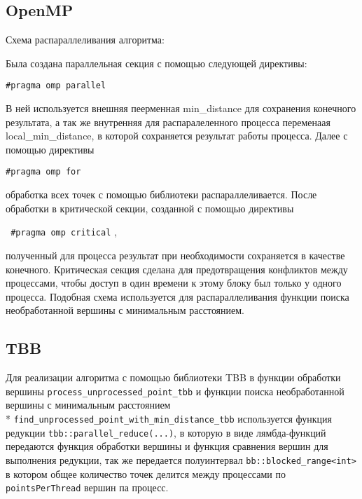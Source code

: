 \documentclass{report}
\begin{document}
\subsection*{OpenMP}
Схема распараллеливания алгоритма:
\par Была создана параллельная секция с помощью следующей директивы:
\par \verb|#pragma omp parallel| 
\par В ней используется внешняя пеерменная min\_distance для сохранения конечного результата, а так же внутренняя для распаралеленного процесса переменаая local\_min\_distance, в которой сохраняется результат работы процесса. Далее с помощью директивы
\par \verb|#pragma omp for |
\par обработка всех точек с помощью библиотеки распараллеливается. После обработки в критической секции, созданной с помощью директивы \par \verb| #pragma omp critical| , \par полученный для процесса результат при необходимости сохраняется в качестве конечного. Критическая секция сделана для предотвращения конфликтов между процессами, чтобы доступ в один времени к этому блоку был только у одного процесса. Подобная схема используется для распараллеливания функции поиска необработанной вершины с минимальным расстоянием.


\subsection*{TBB}
\begin{sloppypar}
Для реализации алгоритма с помощью библиотеки TBB в функции обработки вершины \verb|process_unprocessed_point_tbb| и функции поиска необработанной вершины с минимальным расстоянием \\* \verb|find_unprocessed_point_with_min_distance_tbb| используется функция редукции \verb|tbb::parallel_reduce(...)|, в которую в виде лямбда-функций передаются функция обработки вершины и функция сравнения вершин для выполнения редукции, так же передается полуинтервал \verb|bb::blocked_range<int>| в котором общее количество точек делится между процессами по \verb|pointsPerThread| вершин па процесс.
\end{sloppypar}
\end{document}
